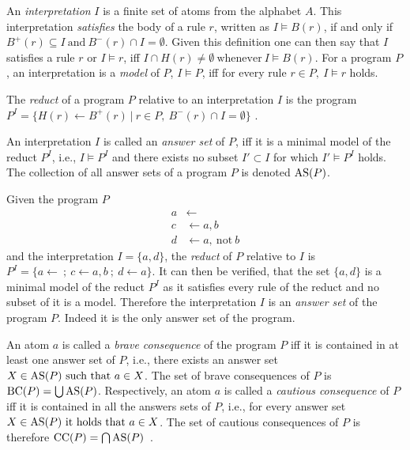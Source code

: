 An \emph{interpretation} $I$ is a finite set of atoms from the alphabet $A$. This interpretation \emph{satisfies} the body of a rule $r$, written as \(I \models B(r)\), if and only if \(B^+(r) \subseteq I\ \text{and}\ B^-(r) \cap I = \emptyset\). Given this definition one can then say that $I$ satisfies a rule $r$ or \(I \models r\), iff \(I \cap H(r) \neq \emptyset \ \text{whenever}\ I \models B(r)\). For a program $P$, an interpretation is a \emph{model} of $P$, \(I \models P\), iff for every rule \(r \in P,\ I \models r\) holds.
\begin{definition}
\label{def:reduct}
    The \emph{reduct} of a program $P$ relative to an interpretation $I$ is the program \(P^I = \{ H(r) \leftarrow B^+(r) \ | \ r \in P,\ B^-(r) \cap I = \emptyset\}\) \cite{GL88}.
\end{definition}
An interpretation $I$ is called an \emph{answer set} of $P$, iff it is a minimal model of the reduct \(P^I\), i.e., \(I \models P^I \) and there exists no subset \( I' \subset I \) for which \( I' \models P^{I}\) holds. The collection of all answer sets of a program $P$ is denoted \(\operatorname{AS}(P)\).
\begin{example}
\label{ex:reduct}
    Given the program $P$
    \begin{align*}
        a &\leftarrow \\
        c &\leftarrow a, b \\
        d &\leftarrow a,\ \text{not}\ b
    \end{align*}
    and the interpretation \(I = \{a, d\}\), the \emph{reduct} of $P$ relative to $I$ is \(P^I = \{a \leftarrow\ ;\ c \leftarrow a, b\ ;\ d \leftarrow a\}\). It can then be verified, that the set \(\{a,d\}\) is a minimal model of the reduct \(P^I\) as it satisfies every rule of the reduct and no subset of it is a model. Therefore the interpretation $I$ is an \emph{answer set} of the program $P$. Indeed it is the only answer set of the program.
\end{example}
An atom $a$ is called a \emph{brave consequence} of the program $P$ iff it is contained in at least one answer set of $P$, i.e., there exists an answer set \(X \in \operatorname{AS}(P) \ \text{such that}\ a \in X\). The set of brave consequences of $P$ is \(\text{BC}(P) = \bigcup \operatorname{AS}(P)\).
Respectively, an atom $a$ is called a \emph{cautious consequence} of $P$ iff it is contained in all the answers sets of $P$, i.e., for every answer set \( X \in \AS(P) \ \text{it holds that}\ a \in X\). The set of cautious consequences of $P$ is therefore \(\text{CC}(P) = \bigcap \operatorname{AS}(P)\)~\cite{FGR22}.


